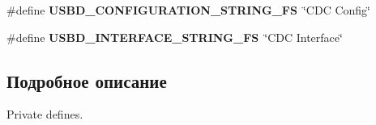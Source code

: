 \begin{CompactItemize}
\item 
\hypertarget{group___u_s_b_d___d_e_s_c___private___defines_gca5e66e8b6c89a896f6ad16f9a68128f}{
\#define \textbf{USBD\_\-CONFIGURATION\_\-STRING\_\-FS}~\char`\"{}CDC Config\char`\"{}}
\label{group___u_s_b_d___d_e_s_c___private___defines_gca5e66e8b6c89a896f6ad16f9a68128f}

\item 
\hypertarget{group___u_s_b_d___d_e_s_c___private___defines_g2562ccc9162020b79f07d813eba10ddb}{
\#define \textbf{USBD\_\-INTERFACE\_\-STRING\_\-FS}~\char`\"{}CDC Interface\char`\"{}}
\label{group___u_s_b_d___d_e_s_c___private___defines_g2562ccc9162020b79f07d813eba10ddb}

\end{CompactItemize}


\subsection{Подробное описание}
Private defines. 